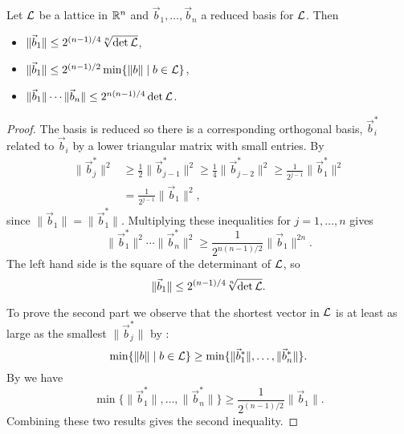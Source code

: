 \begin{proposition}\label{ReducedLattice:Prop}
Let ${\cal L}$ be a lattice in $\mathbb{R}^n$ and $\vec{b}_1, \ldots, \vec{b}_n$ a
reduced basis for ${\cal L}$.  Then
\begin{itemize}
\item $\| \vec{b}_1 \| \le 2^{(n-1)/4} \sqrt[n]{\det {\cal L}}$,
\item $\| \vec{b}_1 \| \le 2^{(n-1)/2} \min \{ \|b\| \mid b\in {\cal L}\}$,
\item $\|\vec{b}_1\| \cdots \|\vec{b}_n\| \le 2^{n(n-1)/4} \det {\cal L}$.
\end{itemize}
\end{proposition}

\begin{proof}
The basis is reduced so there is a corresponding orthogonal basis,
$\vec{b}^{\ast}_i$ related to $\vec{b}_i$ by a lower triangular matrix
with small entries.  By 
\begin{equation}\label{Lat:Vect:est:Eq}
\begin{aligned}
\|\vec{b}^{\ast}_j \|^2 
  & \displaystyle
    \ge \frac{1}{2} \|\vec{b}^{\ast}_{j-1}\|^2
    \ge \frac{1}{4}\|\vec{b}^{\ast}_{j-2}\|^2 
    \ge \frac{1}{2^{j-1}} \|\vec{b}^{\ast}_1 \|^2 \\
   &= \displaystyle \frac{1}{2^{j-1}} \|\vec{b}_1\|^2,
\end{aligned}
\end{equation}
since $\|\vec{b}_1\| = \|\vec{b}^{\ast}_1\|$.  Multiplying these
inequalities for $j = 1, \ldots, n$ gives
\[
\|\vec{b}^{\ast}_1\|^2 \cdots \|\vec{b}^{\ast}_n\|^2 \ge
 \frac{1}{2^{n(n-1)/2}} \|\vec{b}_1\|^{2n}.
\]
The left hand side is the square of the determinant of ${\cal L}$, so 
\[
\|\vec{b}_1\| \le 2^{(n-1)/4} \sqrt[n]{\det {\cal L}}.
\]

To prove the second part we observe that the shortest vector in ${\cal
L}$ is at least as large as the smallest $\|\vec{b}^{\ast}_j\|$ by
:
\[
\min \{ \|b\| \mid b \in {\cal L} \} \ge \min\{ \|\vec{b}^{\ast}_1\|,
\ldots, \|\vec{b}^{\ast}_n\| \}.
\]
By  we have 
\[
\min \{ \|\vec{b}^{\ast}_1\|, \ldots, \|\vec{b}^{\ast}_n\| \} 
   \ge \frac{1}{2^{(n- 1)/2}} \|\vec{b}_1\|.
\]
Combining these two results gives the second inequality.


\end{proof}
